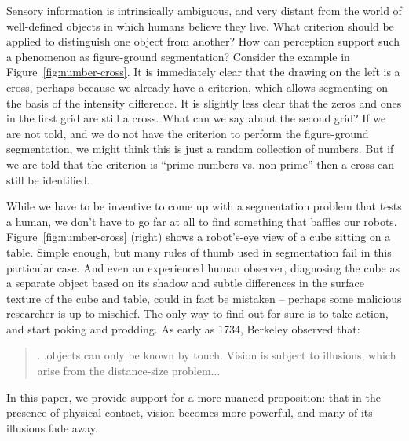 Sensory information is intrinsically ambiguous, and very distant from
the world of well-defined objects in which humans believe they live.  
What criterion should be applied to distinguish one object from
another?  How can perception support such a phenomenon as figure-ground
segmentation?  
Consider the example in Figure~\ref{fig:number-cross}.  It is
immediately clear that the drawing on the left is a cross, perhaps
because we already have a criterion, which allows segmenting on the
basis of the intensity difference. It is slightly less clear that the
zeros and ones in the first grid are still a cross. What can we say
about the second grid? If we are not told, and we do not have
the criterion to perform the figure-ground segmentation, we might
think this is just a random collection of numbers. But if we are told
that the criterion is ``prime numbers vs. non-prime'' then a cross can
still be identified.

While we have to be inventive to come up with a segmentation problem
that tests a human, we don't have to go far at all to find something
that baffles our robots.  Figure~\ref{fig:number-cross} (right) shows a
robot's-eye view of a cube sitting on a table.  Simple enough, but
many rules of thumb used in segmentation fail in this particular case.
And even an experienced human observer, diagnosing the cube as a
separate object based on its shadow and subtle differences in the
surface texture of the cube and table, could in fact be mistaken --
perhaps some malicious researcher is up to mischief.  The only way to
find out for sure is to take action, and start poking and prodding.
As early as 1734, Berkeley observed that:
%
\begin{quote}
...objects can only be known by
touch. Vision is subject to illusions, which arise from the
distance-size problem... \cite{berkeley72new}
\end{quote}
%
In this paper, we provide support for a more nuanced proposition: that
in the presence of physical contact, vision becomes more powerful, and many of
its illusions fade away.


